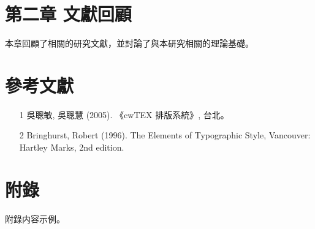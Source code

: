 \documentclass[12pt,a4paper]{report}
\begin{document}
\chapter*{第二章 文獻回顧}
本章回顧了相關的研究文獻，並討論了與本研究相關的理論基礎。


\newpage
\chapter*{參考文獻}
\begin{itemize}
    \item [1] 吳聰敏, 吳聰慧 (2005). 《cwTEX 排版系統》, 台北。
    \item [2] Bringhurst, Robert (1996). The Elements of Typographic Style, Vancouver: Hartley  Marks, 2nd edition.
\end{itemize}

\newpage
\chapter*{附錄}
附錄内容示例。
\end{document}
